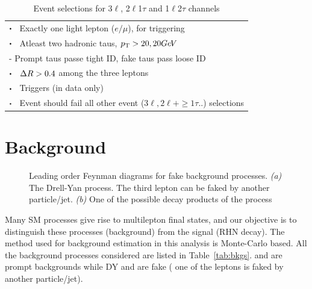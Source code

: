 \documentclass[letterpaper,12pt]{article}
\newcommand\sbullet[1][.5]{\mathbin{\vcenter{\hbox{\scalebox{#1}{$\bullet$}}}}}  %
\newcommand{\GeV}{{Ge\kern -0.1em V}}
\begin{document}
\begin{table}
{\begin{tabular}{l}
    \hline
    $\sbullet \hspace{0.2cm}$ Exactly one light lepton ($e/\mu$), for triggering\\
    $\sbullet \hspace{0.2cm}$ Atleast two hadronic taus, $\pt>20,20 \GeV$\\
    \hspace{1cm}- Prompt taus passe tight ID, fake taus pass loose ID\\
    $\sbullet \hspace{0.2cm}$ $\Delta R>0.4$ among the three leptons\\
    $\sbullet \hspace{0.2cm}$ Triggers (in data only)\\
    $\sbullet \hspace{0.2cm}$ Event should fail all other event ($3\ell,2\ell+\geq1\tau..$) selections\\
    \hline \hline
    \end{tabular}%
  }
  \caption{Event selections for 3$\ell$, 2$\ell$1$\tau$ and 1$\ell$2$\tau$ channels}
  \label{tab:eventsel}
\end{table}


\section{Background}
\label{sec:bkgs}

\begin{figure}
  \begin{adjustbox}{minipage=\textwidth, scale=0.75}
    \centering
    \qquad
    \caption{\normalsize{Leading order Feynman diagrams for fake background processes. \emph{(a)} The Drell-Yan process. The third lepton can be faked by another particle/jet. \emph{(b)} One of the possible decay products of the \ttbar{} process}}
    \label{fig:bkgsfeyn}
  \end{adjustbox}
\end{figure}
Many SM processes give rise to multilepton final states, and our objective is to distinguish these processes (background) from the signal (RHN decay). The method used for background estimation in this analysis is Monte-Carlo based. All the background processes considered are listed in Table~\ref{tab:bkgs}. \WZ{} and \ZZ{} are prompt backgrounds while DY and \ttbar{} are fake (\ie{} one of the leptons is faked by another particle/jet).   
\end{document}
